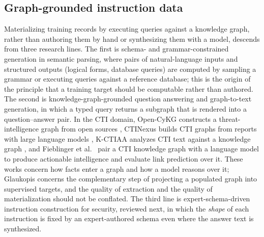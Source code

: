 \documentclass[twocolumn]{svjour3}
\begin{document}
\subsection{Graph-grounded instruction data}\label{sec:bg-graph}
Materializing training records by executing queries against a knowledge graph, rather than authoring them by hand or synthesizing them with a model, descends from three research lines. The first is schema- and grammar-constrained generation in semantic parsing, where pairs of natural-language inputs and structured outputs (logical forms, database queries) are computed by sampling a grammar or executing queries against a reference database; this is the origin of the principle that a training target should be computable rather than authored. The second is knowledge-graph-grounded question answering and graph-to-text generation, in which a typed query returns a subgraph that is rendered into a question--answer pair. In the CTI domain, Open-CyKG constructs a threat-intelligence graph from open sources \cite{sarhan2021opencykg}, CTINexus builds CTI graphs from reports with large language models \cite{cheng2024ctinexus}, K-CTIAA analyzes CTI text against a knowledge graph \cite{li2023kctiaa}, and Fieblinger et al.~\cite{fieblinger2024actionable} pair a CTI knowledge graph with a language model to produce actionable intelligence and evaluate link prediction over it. These works concern how facts enter a graph and how a model reasons over it; Glaukopis concerns the complementary step of projecting a populated graph into supervised targets, and the quality of extraction and the quality of materialization should not be conflated. The third line is expert-schema-driven instruction construction for security, reviewed next, in which the \emph{shape} of each instruction is fixed by an expert-authored schema even where the answer text is synthesized.
\end{document}
